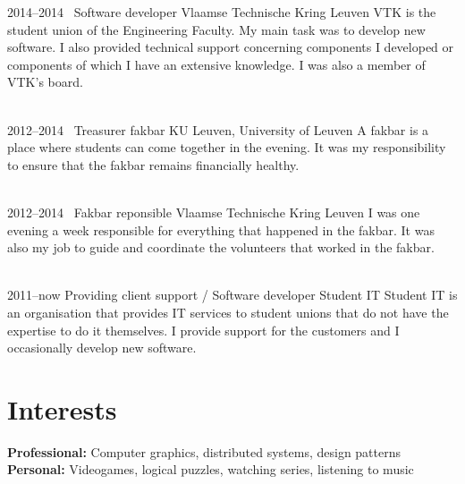 \documentclass[a4paper]{friggeri-cv} %
\begin{document}
\begin{entrylist}
\entry
{2014--2014~}
{Software developer}
{Vlaamse Technische Kring Leuven}
{VTK is the student union of the Engineering Faculty. My main task was to develop new software. I also provided technical support concerning components I developed or components of which I have an extensive knowledge.
I was also a member of VTK’s board.\\
~}


\entry
{2012--2014~}
{Treasurer fakbar}
{KU Leuven, University of Leuven}
{A fakbar is a place where students can come together in the evening. It was my responsibility to ensure that the fakbar remains financially healthy.\\
~}


\entry
{2012--2014~}
{Fakbar reponsible}
{Vlaamse Technische Kring Leuven}
{I was one evening a week responsible for everything that happened in the fakbar. It was also my job to guide and coordinate the volunteers that worked in the fakbar.\\
~}


\entry
{2011--now}
{Providing client support / Software developer}
{Student IT}
{Student IT is an organisation that provides IT services to student unions that do not have the expertise to do it themselves. I provide support for the customers and I occasionally develop new software.}

\end{entrylist}



\section{Interests}

\textbf{Professional:} Computer graphics, distributed systems, design patterns\\
\textbf{Personal:} Videogames, logical puzzles, watching series, listening to music
\end{document}
